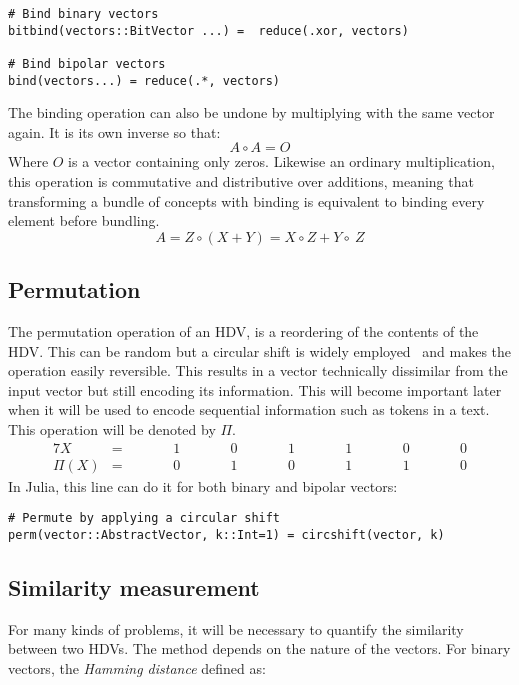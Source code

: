 \begin{verbatim}
# Bind binary vectors
bitbind(vectors::BitVector ...) =  reduce(.xor, vectors)

# Bind bipolar vectors
bind(vectors...) = reduce(.*, vectors)
\end{verbatim}

The binding operation can also be undone by multiplying with the same vector again. It is its own inverse so that:
\begin{equation}
    \label{eqn:multpinv}
    A \circ A = O
\end{equation}
Where $O$ is a vector containing only zeros. Likewise an ordinary multiplication, this operation is commutative and distributive over additions, meaning that transforming a bundle of concepts with binding is equivalent to binding every element before bundling.
\begin{equation}
    \label{eqn:multpdis}
    A = Z \circ (X + Y) = X \circ Z + Y \circ\ Z
\end{equation}
\subsection*{Permutation} \label{sssec:perm}
The permutation operation of an HDV, is a reordering of the contents of the HDV. This can be random but a circular shift is widely employed~\cite{HD_rev} and makes the operation easily reversible. This results in a vector technically dissimilar from the input vector but still encoding its information. This will become important later when it will be used to encode sequential information such as tokens in a text. This operation will be denoted by $\Pi$.
\begin{alignat*}{7}
    X &= && \qquad 1 && \qquad 0 && \qquad 1 && \qquad 1 && \qquad 0 && \qquad 0 \\
    \hline
    \Pi(X) &= && \qquad 0 && \qquad 1 && \qquad 0 &&  \qquad 1 && \qquad 1 && \qquad 0
\end{alignat*}
In Julia, this line can do it for both binary and bipolar vectors:

\begin{verbatim}
# Permute by applying a circular shift
perm(vector::AbstractVector, k::Int=1) = circshift(vector, k)
\end{verbatim}

\subsection*{Similarity measurement} \label{sssec:sim}
For many kinds of problems, it will be necessary to quantify the similarity between two HDVs. The method depends on the nature of the vectors. For binary vectors, the \textit{Hamming distance} defined as:

